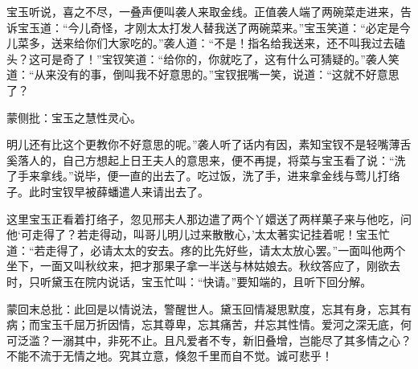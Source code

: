 \begin{parag}
    宝玉听说，喜之不尽，一叠声便叫袭人来取金线。正值袭人端了两碗菜走进来，告诉宝玉道：“今儿奇怪，才刚太太打发人替我送了两碗菜来。”宝玉笑道：“必定是今儿菜多，送来给你们大家吃的。”袭人道：“不是！指名给我送来，还不叫我过去磕头？这可是奇了！”宝钗笑道：“给你的，你就吃了，这有什么可猜疑的。”袭人笑道：“从来没有的事，倒叫我不好意思的。”宝钗抿嘴一笑，说道：“这就不好意思了？\begin{note}蒙侧批：宝玉之慧性灵心。\end{note}明儿还有比这个更教你不好意思的呢。”袭人听了话内有因，素知宝钗不是轻嘴薄舌奚落人的，自己方想起上日王夫人的意思来，便不再提，将菜与宝玉看了说：“洗了手来拿线。”说毕，便一直的出去了。吃过饭，洗了手，进来拿金线与莺儿打络子。此时宝钗早被薛蟠遣人来请出去了。
\end{parag}


\begin{parag}
    这里宝玉正看着打络子，忽见邢夫人那边遣了两个丫嬛送了两样菓子来与他吃，问他‘可走得了？若走得动，叫哥儿明儿过来散散心，’太太著实记挂着呢！宝玉忙道：“若走得了，必请太太的安去。疼的比先好些，请太太放心罢。”一面叫他两个坐下，一面又叫秋纹来，把才那果子拿一半送与林姑娘去。秋纹答应了，刚欲去时，只听黛玉在院内说话，宝玉忙叫：“快请。”要知端的，且听下回分解。
\end{parag}


\begin{parag}
    \begin{note}蒙回末总批：此回是以情说法，警醒世人。黛玉回情凝思默度，忘其有身，忘其有病；而宝玉千屈万折因情，忘其尊卑，忘其痛苦，幷忘其性情。爱河之深无底，何可泛滥？一溺其中，非死不止。且凡爱者不专，新旧叠增，岂能尽了其多情之心？不能不流于无情之地。究其立意，倏忽千里而自不觉。诚可悲乎！\end{note}
\end{parag}

